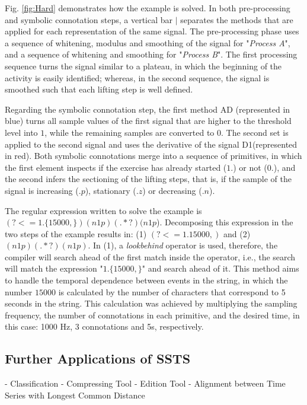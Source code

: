 Fig. \ref{fig:Hard} demonstrates how the example is solved. In both pre-processing and symbolic connotation steps, a vertical bar $|$ separates the methods that are applied for each representation of the same signal. The pre-processing phase uses a sequence of whitening, modulus and smoothing of the signal for "\textit{Process A}", and a sequence of whitening and smoothing for "\textit{Process B}". The first processing sequence turns the signal similar to a plateau, in which the beginning of the activity is easily identified; whereas, in the second sequence, the signal is smoothed such that each lifting step is well defined.
\par
Regarding the symbolic connotation step, the first method AD (represented in blue) turns all sample values of the first signal that are higher to the threshold level into $1$, while the remaining samples are converted to $0$. The second set is applied to the second signal and uses the derivative of the signal D1(represented in red). Both symbolic connotations merge into a sequence of primitives, in which the first element inspects if the exercise has already started ($1.$)  or not ($0.$), and the second infers the sectioning of the lifting steps, that is, if the sample of the signal is increasing ($.p$), stationary ($.z$) or decreasing ($.n$).
\par
The regular expression written to solve the example is $(?<=1.\{15000,\})(n1p)(.*?)(n1p$). Decomposing this expression in the two steps of the example results in: (1) $(?<=1.{15000,})$ and (2)$(n1p)(.*?)(n1p)$. In (1), a \textit{lookbehind} operator is used, therefore, the compiler will search ahead of the first match inside the operator, i.e., the search will match the expression "$1.\{15000,\}$" and search ahead of it. This method aims to handle the temporal dependence between events in the string, in which the number $15000$ is calculated by the number of characters that correspond to 5 seconds in the string. This calculation was achieved by multiplying the sampling frequency, the number of connotations in each primitive, and the desired time, in this case: 1000 Hz, 3 connotations and 5s, respectively.

\subsection{Further Applications of SSTS}

- Classification
- Compressing Tool
- Edition Tool
- Alignment between Time Series with Longest Common Distance


